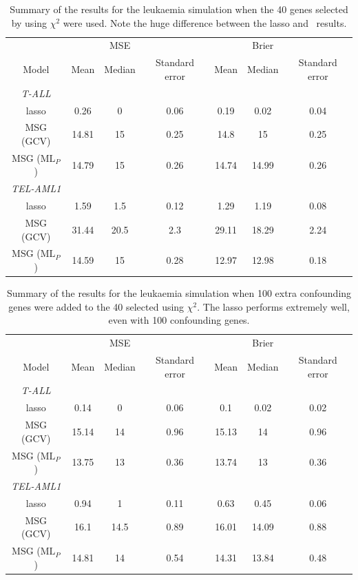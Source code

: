 \begin{table}  
\begin{centering}
\begin{tabular}{c || ccc | ccc}
    &  & MSE &  &  & Brier & \\ 
Model & Mean & Median & Standard error & Mean & Median & Standard error \\
\hline
\textit{T-ALL} & & & & & & \\
lasso &  0.26 & 0 & 0.06 & 0.19 & 0.02 & 0.04 \\
MSG (GCV) & 14.81 & 15 & 0.25 & 14.8 & 15 & 0.25 \\
MSG ($\text{ML}_P$) &  14.79 & 15 & 0.26 & 14.74 & 14.99 & 0.26 \\
\textit{TEL-AML1}  & & &  & & & \\
lasso &  1.59 & 1.5 & 0.12 & 1.29 & 1.19 & 0.08 \\
MSG (GCV) & 31.44 & 20.5 & 2.3 & 29.11 & 18.29 & 2.24 \\
MSG ($\text{ML}_P$) &  14.59 & 15 & 0.28 & 12.97 & 12.98 & 0.18 \\
  \end{tabular}
\caption{Summary of the results for the leukaemia simulation when the 40 genes selected by  using $\chi^2$ were used. Note the huge difference between the lasso and \mdsds\ results.}
\label{leuk-sim}
\end{centering}
\end{table}


\begin{table}  
\begin{centering}
\begin{tabular}{c || ccc | ccc}
    &  & MSE &  &  & Brier & \\ 
    Model & Mean & Median & Standard error & Mean & Median & Standard error \\
    \hline
\textit{T-ALL}  & & & & & & \\
lasso &  0.14 & 0 & 0.06 & 0.1 & 0.02 & 0.02 \\
MSG (GCV) & 15.14 & 14 & 0.96 & 15.13 & 14 & 0.96 \\
MSG ($\text{ML}_P$) &  13.75 & 13 & 0.36 & 13.74 & 13 & 0.36 \\
\textit{TEL-AML1}  & & & & & & \\
lasso &  0.94 & 1 & 0.11 & 0.63 & 0.45 & 0.06 \\
MSG (GCV) & 16.1 & 14.5 & 0.89 & 16.01 & 14.09 & 0.88 \\
MSG ($\text{ML}_P$) &  14.81 & 14 & 0.54 & 14.31 & 13.84 & 0.48 \\
  \end{tabular}
\caption{Summary of the results for the leukaemia simulation when 100 extra confounding genes were added to the 40 selected using $\chi^2$. The lasso performs extremely well, even with 100 confounding genes.}
\label{leuk-confsim}
\end{centering}
\end{table}

